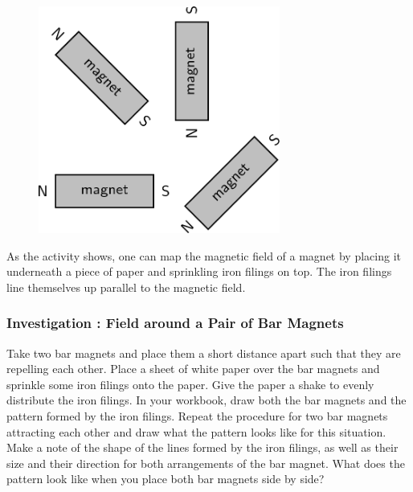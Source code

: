     \setcounter{subfigure}{0}


	\begin{figure}[H] %
    \begin{center}
    \label{m37830*id129078!!!underscore!!!media}\label{m37830*id129078!!!underscore!!!printimage}\includegraphics[width=300px]{col11305.imgs/m37830_PG10C7_009.png} %
        
      \vspace{2pt}
    \vspace{.1in}
    
    \end{center}

 \end{figure}   

    \addtocounter{footnote}{-0}
    
        \par 
        

        \label{m37830*id129093}As the activity shows, one can map the magnetic field of a magnet by
placing it underneath a piece of paper and sprinkling
iron filings on top. The iron filings line themselves up parallel to the magnetic field.\par 
\label{m37830*secfhsst!!!underscore!!!id267}
            \subsubsection{  Investigation : Field around a Pair of Bar Magnets }
            \nopagebreak
            
        \label{m37830*id129105}Take two bar magnets
and place them a short distance apart such that they are repelling
each other. Place a sheet of white paper over the bar magnets and
sprinkle some iron filings onto the paper. Give the paper a shake
to evenly distribute the iron filings. In your workbook, draw both
the bar magnets and the pattern formed by the iron filings. Repeat
the procedure for two bar magnets attracting each other and draw
what the pattern looks like for this situation. Make a note of the
shape of the lines formed by the iron filings, as well as their
size and their direction for both arrangements of the bar magnet.
What does the pattern look like when you place both bar magnets
side by side?\par 
        \label{m37830*id129116}
          

